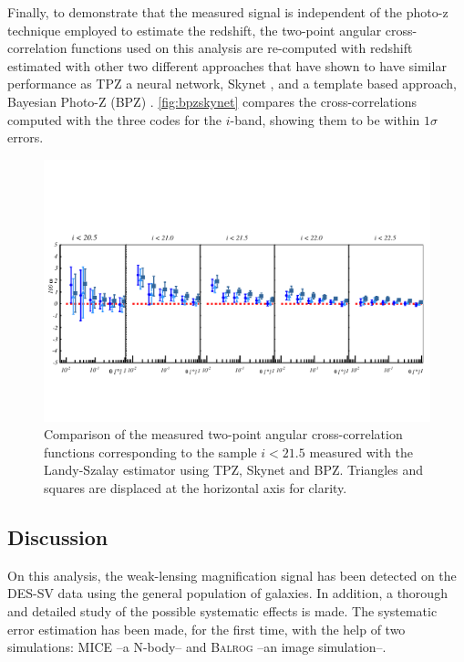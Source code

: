     Finally, to demonstrate that the measured signal is independent of the photo-z technique employed to estimate the redshift, the two-point angular cross-correlation functions used on this analysis are re-computed with redshift estimated with other two different approaches that have shown to have similar performance as TPZ \cite{2014MNRAS.445.1482S} a neural network, Skynet  \cite{2014MNRAS.441.1741G}, and a template based approach, Bayesian Photo-Z (BPZ) \cite{2000ApJ...536..571B}. \autoref{fig:bpzskynet} compares the cross-correlations computed with the three codes for the $i$-band, showing them to be within $1\sigma$ errors.
\begin{figure}
\includegraphics[width=\textwidth,trim={0 2.3cm 0 3.5cm},clip]{./figures/mag_i_photoz_comparison.pdf}
\caption{Comparison of the measured two-point angular cross-correlation functions corresponding to the sample $i<21.5$ measured with the Landy-Szalay estimator using TPZ, Skynet and BPZ. Triangles and squares are displaced at the horizontal axis for clarity.}
\label{fig:bpzskynet}
\end{figure}

\subsection{Discussion}
\label{sec:discussion_sv}

On this analysis, the weak-lensing magnification signal has been detected on the DES-SV data using the general population of galaxies. In addition, a thorough and detailed study of the possible systematic effects is made. The systematic error estimation has been made, for the first time, with the help of two simulations: MICE --a N-body-- and {\scshape Balrog} --an image simulation--.
\newline

